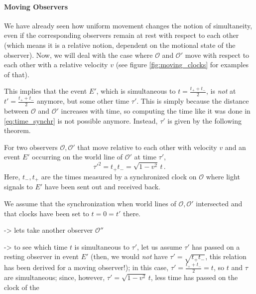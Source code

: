 \fi




			\paragraph{Moving Observers}
We have already seen how uniform movement changes the notion of simultaneity, even if the corresponding observers remain at rest with respect to each other (which means it is a relative notion, dependent on the motional state of the observer). Now, we will deal with the case where $\mathcal{O}$ and $\mathcal{O}'$ move with respect to each other with a relative velocity $v$ (see figure \ref{fig:moving_clocks} for examples of that).

This implies that the event $E'$, which is simultaneous to $t = \frac{t_+ + t_-}{2}$, is \emph{not} at $t' = \frac{t_+ + t_-}{2}$ anymore, but some other time $\tau'$. This is simply because the distance between $\mathcal{O}$ and $\mathcal{O}'$ increases with time, so computing the time like it was done in \eqref{eq:time_synchr} is not possible anymore. Instead, $\tau'$ is given by the following theorem.
\begin{thm}[Minkowski's Theorem]
For two observers $\mathcal{O}, \mathcal{O}'$ that move relative to each other with velocity $v$ and an event $E'$ occurring on the world line of $\mathcal{O}'$ at time $\tau'$,
\begin{equation}
\tau'^2 = t_+ t_- = \sqrt{1 - v^2} \, t \, .
\end{equation}
Here, $t_-, t_+$ are the times measured by a synchronized clock on $\mathcal{O}$ where light signals to $E'$ have been sent out and received back.
\end{thm}
We assume that the synchronization when world lines of $\mathcal{O}, \mathcal{O}'$ intersected and that clocks have been set to $t = 0 = t'$ there. %

-> lets take another observer $\mathcal{O}''$


-> to see which time $t$ is simultaneous to $\tau'$, let us assume $\tau'$ has passed on a resting observer in event $E'$ (then, we would \emph{not} have $\tau' = \sqrt{t_+ t_-}$, this relation has been derived for a moving observer!); in this case, $\tau' = \frac{t_+ + t_-}{2} = t$, so $t$ and $\tau$ are simultaneous; since, however, $\tau' = \sqrt{1 - v^2} \, t$, less time has passed on the clock of the 

